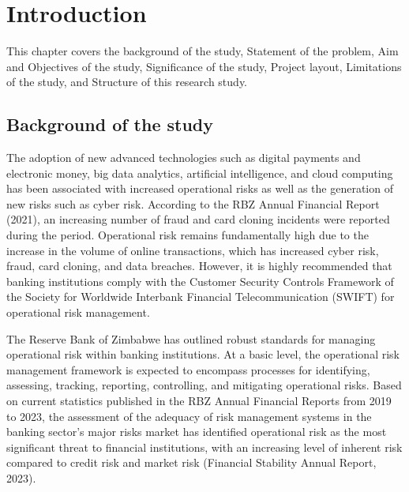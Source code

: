 \chapter{Introduction}
\normalfont %
\fontsize{14}{17}\selectfont %
\vspace{-5pt} %

This chapter covers the background of the study, Statement of the problem, Aim and Objectives of the study, Significance of the study, Project layout, Limitations of the study, and Structure of this research study.\\



\section{Background of the study}
\normalfont %
\fontsize{14}{17}\selectfont %

The adoption of new advanced technologies such as digital payments and electronic money, big data analytics, artificial intelligence, and cloud computing has been associated with increased operational risks as well as the generation of new risks such as cyber risk. According to the RBZ Annual Financial Report (2021), an increasing number of fraud and card cloning incidents were reported during the period. Operational risk remains fundamentally high due to the increase in the volume of online transactions, which has increased cyber risk, fraud, card cloning, and data breaches. However, it is highly recommended that banking institutions comply with the Customer Security Controls Framework of the Society for Worldwide Interbank Financial Telecommunication (SWIFT) for operational risk management.

The Reserve Bank of Zimbabwe has outlined robust standards for managing operational risk within banking institutions. At a basic level, the operational risk management framework is expected to encompass processes for identifying, assessing, tracking, reporting, controlling, and mitigating operational risks. Based on current statistics published in the RBZ Annual Financial Reports from 2019 to 2023, the assessment of the adequacy of risk management systems in the banking sector's major risks market has identified operational risk as the most significant threat to financial institutions, with an increasing level of inherent risk compared to credit risk and market risk (Financial Stability Annual Report, 2023). 

